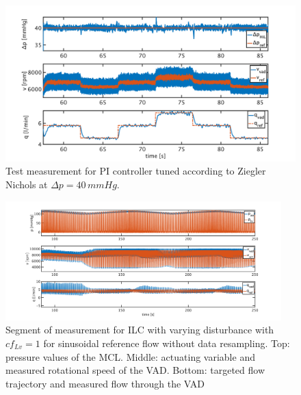 \begin{figure}[ht!]
  \centering
  \includegraphics[width=\textwidth]{images/chapt_5/pi_contr_zn_40.pdf}
  \caption[Test measurement for PI controller tuned according to Ziegler Nichols at $\Delta{p}=40\,mmHg$]{Test measurement for PI controller tuned according to Ziegler Nichols at $\Delta{p}=40\,mmHg$.}
  \label{fig:anh_8}
\end{figure}


\begin{figure}[ht!]
  \centering
  \includegraphics[width=0.95\textwidth]{images/chapt_5/ILC/ilc_var_dist_unfix_sine.pdf}
  \caption[Segment of measurement for ILC with varying disturbance with $cf_{Lv}=1$ for sinusoidal reference flow without data resampling]{Segment of measurement for ILC with varying disturbance with $cf_{Lv}=1$ for sinusoidal reference flow without data resampling. Top:  pressure values of the MCL. Middle: actuating variable and measured rotational speed of the VAD. Bottom: targeted flow trajectory and measured flow through the VAD}
 \label{fig:anh_9}
\end{figure}

